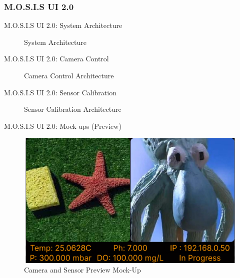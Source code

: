 \documentclass[17pt, aspectratio=169]{beamer}
\begin{document}
\subsubsection*{M.O.S.I.S UI 2.0}
\begin{frame}{M.O.S.I.S UI 2.0: System Architecture}
	\begin{figure}
		\caption{System Architecture}
	\end{figure}
\end{frame}
\begin{frame}{M.O.S.I.S UI 2.0: Camera Control}
	\begin{figure}
		\caption{Camera Control Architecture}
	\end{figure}
\end{frame}
\begin{frame}{M.O.S.I.S UI 2.0: Sensor Calibration}
	\begin{figure}
		\caption{Sensor Calibration Architecture}
	\end{figure}
\end{frame}
\begin{frame}{M.O.S.I.S UI 2.0: Mock-ups (Preview)}
	\begin{figure}
		\includegraphics[page=1,height=0.65\textheight]{../../Progress_Report_Document/Appendix/Design_Documentation/User_Interface/Figures/M.O.S.I.S_UI_Design.pdf}
		\caption{Camera and Sensor Preview Mock-Up}
	\end{figure}
\end{frame}
\end{document}
